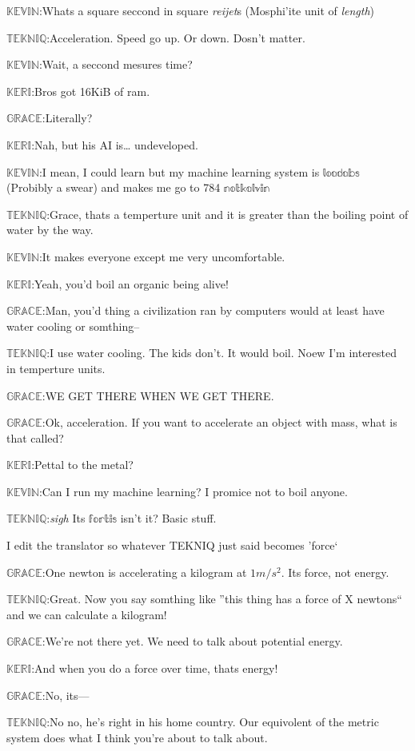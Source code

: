 \documentclass{article}
\newcommand{\gr}{\noindent$\mathbb{GRACE}$:}
\newcommand{\tek}{\noindent$\mathbb{TEKNIQ}$:}
\newcommand{\kev}{\noindent$\mathbb{KEVIN}$:}
\newcommand{\kem}{\noindent$\mathbb{KERI}$:}
\begin{document}
\kev Whats a square seccond in square \emph{reijet}s (Mosphi'ite unit of \emph{length})

\tek Acceleration. Speed go up. Or down. Dosn't matter.

\kev Wait, a seccond mesures time?

\kem Bros got 16KiB of ram.

\gr Literally?

\kem Nah, but his AI is\ldots{} undeveloped.

\kev I mean, I could learn but my machine learning system is $\mathbb{loadabs}$ (Probibly a swear) and makes me go to 784 $\mathbb{notkalvin}$

\tek Grace, thats a temperture unit and it is greater than the boiling point of water by the way.

\kev It makes everyone except me very uncomfortable.

\kem Yeah, you'd boil an organic being alive!

\gr Man, you'd thing a civilization ran by computers would at least have water cooling or somthing--

\tek I use water cooling. The kids don't. It would boil. Noew I'm interested in temperture units.

\gr WE GET THERE WHEN WE GET THERE.

\gr Ok, acceleration. If you want to accelerate an object with mass, what is that called?

\kem Pettal to the metal?

\kev Can I run my machine learning? I promice not to boil anyone.

\tek \emph{sigh} Its $\mathbb{fortis}$ isn't it? Basic stuff.

I edit the translator so whatever TEKNIQ just said becomes 'force`



\gr One newton is accelerating a kilogram at $1m/s^2$. Its force, not energy.

\tek Great. Now you say somthing like ''this thing has a force of X newtons`` and we can calculate a kilogram!

\gr We're not there yet. We need to talk about potential energy.\

\kem And when you do a force over time, thats energy!

\gr No, its---

\tek No no, he's right in his home country. Our equivolent of the metric system does what I think you're about to talk about.
\end{document}
